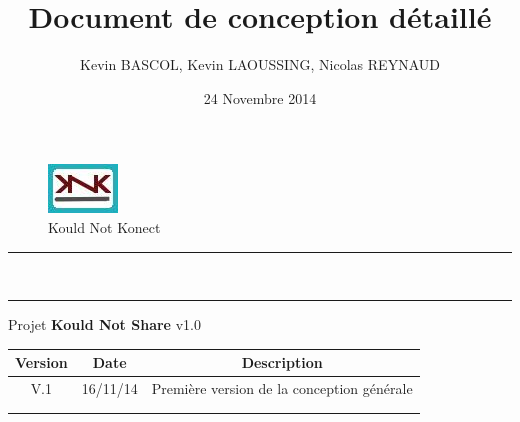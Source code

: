 \documentclass[10pt,a4paper]{report}
\author{Kevin BASCOL, Kevin LAOUSSING, Nicolas REYNAUD}
\title{Document de conception détaillé}
\date{24 Novembre 2014}
\begin{document}
\makeatletter
	\begin{titlepage}
	
	\begin{figure}
		\begin{minipage}[c]{.46\linewidth}
		\end{minipage} \hfill
		\begin{minipage}[c]{.20\linewidth}
			\begin{center}
				\includegraphics{../Logo/logoKNK.jpg}\\
				{\large Kould Not Konect}
			\end{center}
		\end{minipage}
	\vspace{1cm}
	\end{figure}
	
	\centering
		{
		\hrule height 2pt
		\vspace{0.7cm}
		\Huge \textbf{\@title}}\\
		\vspace{0.7cm}
		\hrule height 2pt
		\vspace{1.5cm}
		{\LARGE  Projet \textbf{Kould Not Share} v1.0}
		
		\vfill
		
		\begin{tabular}{|c|c|c|}
			\hline
			Version & Date & Description\\
			\hline
			V.1 & 16/11/14 & Première version de la conception générale\\
			\hline
			 & & \\
			\hline
			 & & \\
			\hline
		\end{tabular}\\
		\vspace{1cm}
		\@author\\
		\end{titlepage}
\makeatother
\setcounter{secnumdepth}{5}
\setcounter{tocdepth}{5}
\renewcommand{\contentsname}{Sommaire}
\begingroup\makeatletter
\def\@makeschapterhead#1{%
  {\parindent \z@ \raggedright
    \normalfont
    \interlinepenalty\@M
    \Huge \bfseries  #1\par\nobreak
    \vskip 20pt%
  }}\makeatother
\tableofcontents
\endgroup
\thispagestyle{empty}
\setcounter{page}{0}
\newpage
\end{document}
